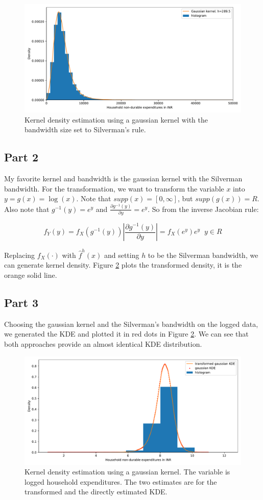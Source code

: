 \documentclass[10pt]{report}
\begin{document}
\begin{figure}[!h]
    \centering 
    \includegraphics[width=.8\textwidth]{../Output/fig_silverman_gauss_kde.pdf}\caption{Kernel density estimation using a gaussian kernel with the bandwidth size set to Silverman's rule.}\label{fig:e7_2}
\end{figure}




\subsection*{Part 2}
My favorite kernel and bandwidth is the gaussian kernel with the Silverman bandwidth. For the transformation, we want to transform the variable $x$ into $y = g(x) =\log(x)$. Note that $supp(x) = [0, \infty]$, but $supp(g(x)) = R$. Also note that $g^{-1}(y) = e^y$ and $\frac{\partial g^{-1}(y)}{\partial y} = e^y$. So from the inverse Jacobian rule:

\[f_Y(y) = f_X(g^{-1}(y))|\frac{\partial g^{-1}(y)}{\partial y} | = f_X(e^y)e^y \;\; y \in R\]

\noindent Replacing $f_X(\cdot)$ with $\hat{f}^h(x)$ and setting $h$ to be the Silverman bandwidth, we can generate kernel density. Figure \ref{fig:e7_3} plots the transformed density, it is the orange solid line. 

\subsection*{Part 3}
Choosing the gaussian kernel and the Silverman's bandwidth on the logged data, we generated the KDE and plotted it in red dots in Figure \ref{fig:e7_3}. We can see that both approaches provide an almost identical KDE distribution.


\begin{figure}[!h]
    \centering 
    \includegraphics[width=.8\textwidth]{../Output/fig_kernel_transformed_gauss_kde.pdf}\caption{Kernel density estimation using a gaussian kernel. The variable is logged household expenditures. The two estimates are for the transformed and the directly estimated KDE.}\label{fig:e7_3}
\end{figure}
\end{document}
